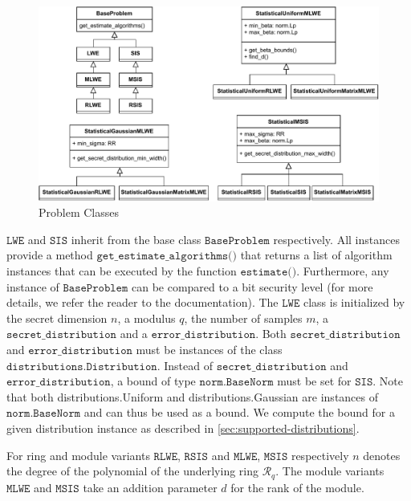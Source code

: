 \begin{figure}[h]
    \centering
    \includegraphics[width=1\textwidth]{graphics/problem_classes.pdf}
    \caption{Problem Classes}\label{fig:problem-classes}
\end{figure}

$\texttt{LWE}$ and $\texttt{SIS}$ inherit from the base class $\texttt{BaseProblem}$ respectively. All instances provide a method $\texttt{get\_estimate\_algorithms()}$ that returns a list of algorithm instances that can be executed by the function $\texttt{estimate()}$. Furthermore, any instance of $\texttt{BaseProblem}$ can be compared to a bit security level (for more details, we refer the reader to the documentation). The $\texttt{LWE}$ class is initialized by the secret dimension $n$, a modulus $q$, the number of samples $m$, a $\texttt{secret\_distribution}$ and a $\texttt{error\_distribution}$. Both $\texttt{secret\_distribution}$ and $\texttt{error\_distribution}$ must be instances of the class $\texttt{distributions.Distribution}$. Instead of $\texttt{secret\_distribution}$ and $\texttt{error\_distribution}$, a bound of type $\texttt{norm.BaseNorm}$ must be set for $\texttt{SIS}$. Note that both {distributions.Uniform} and {distributions.Gaussian} are instances of $\texttt{norm.BaseNorm}$ and can thus be used as a bound. We compute the bound for a given distribution instance as described in \cref{sec:supported-distributions}.

For ring and module variants $\texttt{RLWE}$, $\texttt{RSIS}$ and $\texttt{MLWE}$, $\texttt{MSIS}$ respectively $n$ denotes the degree of the polynomial of the underlying ring $\mathcal{R}_q$. The module variants $\texttt{MLWE}$ and $\texttt{MSIS}$ take an addition parameter $d$ for the rank of the module.


